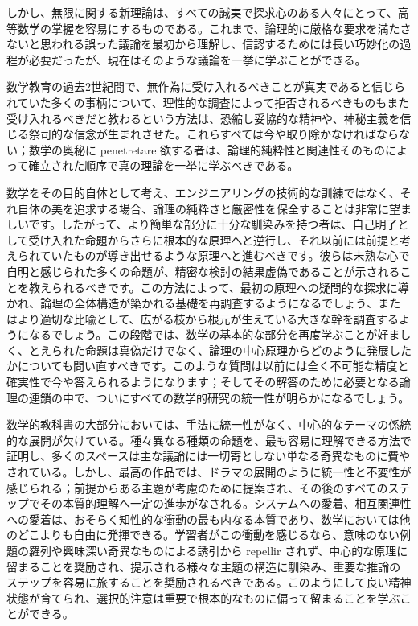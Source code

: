 \documentclass[a4paper,11pt,openany]{ltjsbook}
\begin{document}
しかし、無限に関する新理論は、すべての誠実で探求心のある人々にとって、高等数学の掌握を容易にするものである。これまで、論理的に厳格な要求を満たさないと思われる誤った議論を最初から理解し、信認するためには長い巧妙化の過程が必要だったが、現在はそのような議論を一挙に学ぶことができる。

数学教育の過去2世紀間で、無作為に受け入れるべきことが真実であると信じられていた多くの事柄について、理性的な調査によって拒否されるべきものもまた受け入れるべきだと教わるという方法は、恐縮し妥協的な精神や、神秘主義を信じる祭司的な信念が生まれさせた。これらすべては今や取り除かなければならない；数学の奥秘に penetretare 欲する者は、論理的純粋性と関連性そのものによって確立された順序で真の理論を一挙に学ぶべきである。

数学をその目的自体として考え、エンジニアリングの技術的な訓練ではなく、それ自体の美を追求する場合、論理の純粋さと厳密性を保全することは非常に望ましいです。したがって、より簡単な部分に十分な馴染みを持つ者は、自己明了として受け入れた命題からさらに根本的な原理へと逆行し、それ以前には前提と考えられていたものが導き出せるような原理へと進むべきです。彼らは未熟な心で自明と感じられた多くの命題が、精密な検討の結果虚偽であることが示されることを教えられるべきです。この方法によって、最初の原理への疑問的な探求に導かれ、論理の全体構造が築かれる基礎を再調査するようになるでしょう、またはより適切な比喩として、広がる枝から根元が生えている大きな幹を調査するようになるでしょう。この段階では、数学の基本的な部分を再度学ぶことが好ましく、とえられた命題は真偽だけでなく、論理の中心原理からどのように発展したかについても問い直すべきです。このような質問は以前には全く不可能な精度と確実性で今や答えられるようになります；そしてその解答のために必要となる論理の連鎖の中で、ついにすべての数学的研究の統一性が明らかになるでしょう。

数学的教科書の大部分においては、手法に統一性がなく、中心的なテーマの係統的な展開が欠けている。種々異なる種類の命題を、最も容易に理解できる方法で証明し、多くのスペースは主な議論には一切寄としない単なる奇異なものに費やされている。しかし、最高の作品では、ドラマの展開のように統一性と不変性が感じられる；前提からある主題が考慮のために提案され、その後のすべてのステップでその本質的理解へ一定の進歩がなされる。システムへの愛着、相互関連性への愛着は、おそらく知性的な衝動の最も内なる本質であり、数学においては他のどこよりも自由に発揮できる。学習者がこの衝動を感じるなら、意味のない例題の羅列や興味深い奇異なものによる誘引から repellir されず、中心的な原理に留まることを奨励され、提示される様々な主題の構造に馴染み、重要な推論のステップを容易に旅することを奨励されるべきである。このようにして良い精神状態が育てられ、選択的注意は重要で根本的なものに偏って留まることを学ぶことができる。
\end{document}
